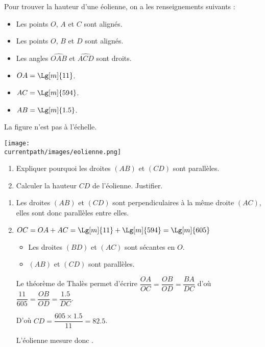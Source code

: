 \begin{exercice*}
    Pour trouver la hauteur d'une éolienne, on a les renseignements suivants :

    \begin{itemize}
        \item Les points $O$, $A$ et $C$ sont alignés.
        \item Les points $O$, $B$ et $D$ sont alignés.
        \item Les angles $\widehat{OAB}$ et $\widehat{ACD}$ sont droits.
        \item $OA = \Lg[m]{11}$.
        \item $AC = \Lg[m]{594}$.
        \item $AB = \Lg[m]{1.5}$.
    \end{itemize}

    \begin{minipage}{1\linewidth}
    \begin{center}
        La figure n'est pas à l'échelle.

        \texttt{[image: \\currentpath/images/eolienne.png]}    
    \end{center}
    \end{minipage}    

    \begin{enumerate}
        \item Expliquer pourquoi les droites $(AB)$ et $(CD)$ sont parallèles.
        \item Calculer la hauteur $CD$ de l'éolienne. Justifier.
    \end{enumerate}
\end{exercice*}
\begin{corrige}
    \begin{enumerate}
        \item Les droites $(AB)$ et $(CD)$ sont perpendiculaires à la même droite $(AC)$, elles sont donc parallèles entre elles.
        \item $OC = OA+AC = \Lg[m]{11}+\Lg[m]{594} = \Lg[m]{605}$
        \begin{itemize}
            \item Les droites $(BD)$ et $(AC)$ sont sécantes en $O$.
            \item $(AB)$ et $(CD)$ sont parallèles.
        \end{itemize}

        Le théorème de Thalès permet d'écrire $\dfrac{OA}{OC}=\dfrac{OB}{OD}=\dfrac{BA}{DC}$ d'où $\dfrac{11}{605}=\dfrac{OB}{OD}=\dfrac{\num{1.5}}{DC}$.

        \medskip
        D'où $CD = \dfrac{605\times \num{1.5}}{11}=\num{82.5}$.

        \medskip
        L'éolienne mesure donc .
    \end{enumerate}
\end{corrige}



